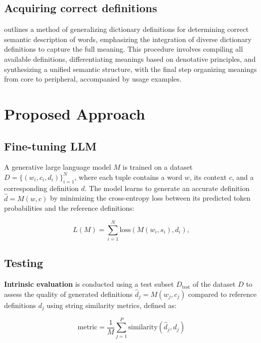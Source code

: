 \documentclass[11pt]{article}
\begin{document}
\subsection{Acquiring correct definitions}

 outlines a method of generalizing dictionary definitions for determining correct semantic description of words,
emphasizing the integration of diverse dictionary definitions to capture the full meaning.
This procedure involves compiling all available definitions, differentiating meanings based on denotative principles, and synthesizing a unified semantic structure,
with the final step organizing meanings from core to peripheral, accompanied by usage examples.

\section{Proposed Approach}\label{sec:proposed-approach}

\subsection{Fine-tuning LLM}

A generative large language model \( M \) is trained on a dataset \( D = \{(w_i, c_i, d_i)\}_{i=1}^{N} \),
where each tuple contains a word \( w \), its context \( c \), and a corresponding definition \( d \).
The model learns to generate an accurate definition \( \hat{d} = M(w, c) \) by minimizing the cross-entropy loss between its predicted token probabilities and the reference definitions:

\begin{equation}
L(M) = \sum_{i=1}^{N} \text{loss}(M(w_i, s_i), d_i),
\end{equation}

\subsection{Testing}

\textbf{Intrinsic evaluation} is conducted using a test subset \( D_{\text{test}} \) of the dataset \( D \)
to assess the quality of generated definitions \( \hat{d}_j = M(w_j, c_j) \)
compared to reference definitions \( d_j \) using string similarity metrics, defined as:

\begin{equation}
\text{metric} = \frac{1}{M} \sum_{j=1}^{P} \text{similarity}(\hat{d}_j, d_j)
\end{equation}
\end{document}
